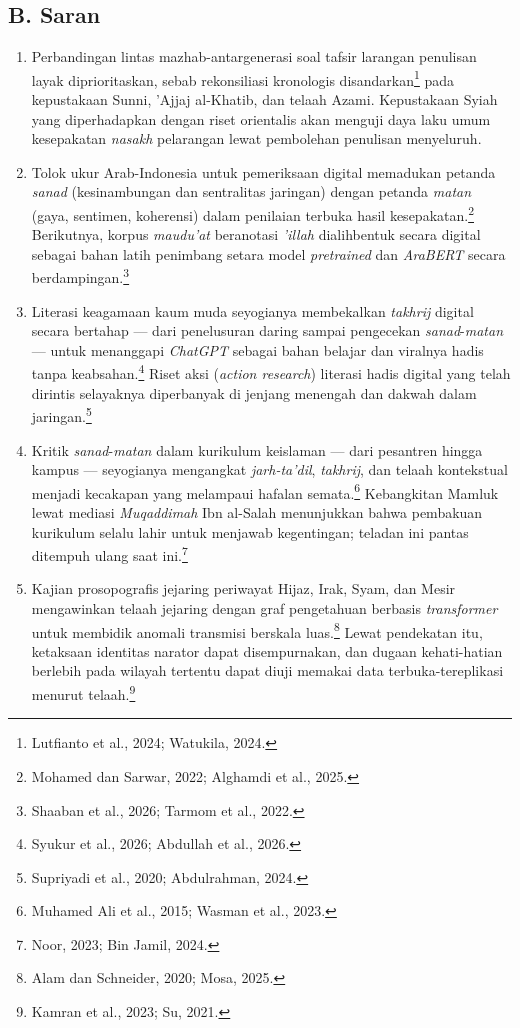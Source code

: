 \subsection*{B. Saran}

\begin{enumerate}[leftmargin=1.27cm,itemsep=2pt,parsep=2pt]
\item Perbandingan lintas mazhab-antargenerasi soal tafsir larangan penulisan layak diprioritaskan, sebab rekonsiliasi kronologis disandarkan\footnote{Lutfianto et al., 2024; Watukila, 2024.} pada kepustakaan Sunni, 'Ajjaj al-Khatib, dan telaah Azami. Kepustakaan Syiah yang diperhadapkan dengan riset orientalis akan menguji daya laku umum kesepakatan \textit{nasakh} pelarangan lewat pembolehan penulisan menyeluruh.

\item Tolok ukur Arab-Indonesia untuk pemeriksaan digital memadukan petanda \textit{sanad} (kesinambungan dan sentralitas jaringan) dengan petanda \textit{matan} (gaya, sentimen, koherensi) dalam penilaian terbuka hasil kesepakatan.\footnote{Mohamed dan Sarwar, 2022; Alghamdi et al., 2025.} Berikutnya, korpus \textit{maudu'at} beranotasi \textit{'illah} dialihbentuk secara digital sebagai bahan latih penimbang setara model \textit{pretrained} dan \textit{AraBERT} secara berdampingan.\footnote{Shaaban et al., 2026; Tarmom et al., 2022.}

\item Literasi keagamaan kaum muda seyogianya membekalkan \textit{takhrij} digital secara bertahap --- dari penelusuran daring sampai pengecekan \textit{sanad}-\textit{matan} --- untuk menanggapi \textit{ChatGPT} sebagai bahan belajar dan viralnya hadis tanpa keabsahan.\footnote{Syukur et al., 2026; Abdullah et al., 2026.} Riset aksi (\textit{action research}) literasi hadis digital yang telah dirintis selayaknya diperbanyak di jenjang menengah dan dakwah dalam jaringan.\footnote{Supriyadi et al., 2020; Abdulrahman, 2024.}

\item Kritik \textit{sanad}-\textit{matan} dalam kurikulum keislaman --- dari pesantren hingga kampus --- seyogianya mengangkat \textit{jarh-ta'dil}, \textit{takhrij}, dan telaah kontekstual menjadi kecakapan yang melampaui hafalan semata.\footnote{Muhamed Ali et al., 2015; Wasman et al., 2023.} Kebangkitan Mamluk lewat mediasi \textit{Muqaddimah} Ibn al-Salah menunjukkan bahwa pembakuan kurikulum selalu lahir untuk menjawab kegentingan; teladan ini pantas ditempuh ulang saat ini.\footnote{Noor, 2023; Bin Jamil, 2024.}

\item Kajian prosopografis jejaring periwayat Hijaz, Irak, Syam, dan Mesir mengawinkan telaah jejaring dengan graf pengetahuan berbasis \textit{transformer} untuk membidik anomali transmisi berskala luas.\footnote{Alam dan Schneider, 2020; Mosa, 2025.} Lewat pendekatan itu, ketaksaan identitas narator dapat disempurnakan, dan dugaan kehati-hatian berlebih pada wilayah tertentu dapat diuji memakai data terbuka-tereplikasi menurut telaah.\footnote{Kamran et al., 2023; Su, 2021.}

\end{enumerate}
